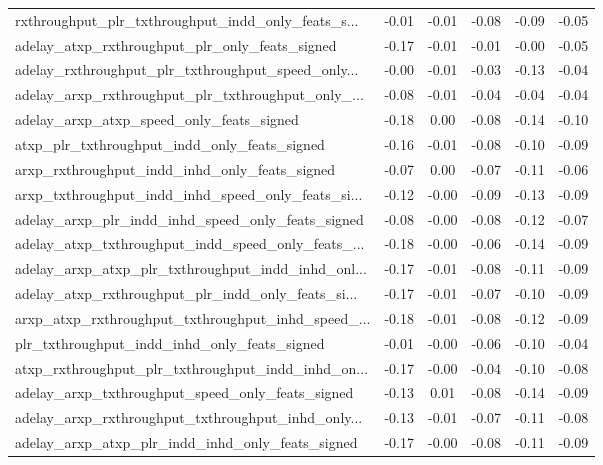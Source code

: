 \begin{tabular}{|l|*{4}{c}|r|}
rxthroughput\_plr\_txthroughput\_indd\_only\_feats\_s... & -0.01 & -0.01 &   -0.08 &      -0.09 & -0.05 \\
adelay\_atxp\_rxthroughput\_plr\_only\_feats\_signed     & -0.17 & -0.01 &   -0.01 &      -0.00 & -0.05 \\
adelay\_rxthroughput\_plr\_txthroughput\_speed\_only... & -0.00 & -0.01 &   -0.03 &      -0.13 & -0.04 \\
adelay\_arxp\_rxthroughput\_plr\_txthroughput\_only\_... & -0.08 & -0.01 &   -0.04 &      -0.04 & -0.04 \\
adelay\_arxp\_atxp\_speed\_only\_feats\_signed           & -0.18 &  0.00 &   -0.08 &      -0.14 & -0.10 \\
atxp\_plr\_txthroughput\_indd\_only\_feats\_signed       & -0.16 & -0.01 &   -0.08 &      -0.10 & -0.09 \\
arxp\_rxthroughput\_indd\_inhd\_only\_feats\_signed      & -0.07 &  0.00 &   -0.07 &      -0.11 & -0.06 \\
arxp\_txthroughput\_indd\_inhd\_speed\_only\_feats\_si... & -0.12 & -0.00 &   -0.09 &      -0.13 & -0.09 \\
adelay\_arxp\_plr\_indd\_inhd\_speed\_only\_feats\_signed  & -0.08 & -0.00 &   -0.08 &      -0.12 & -0.07 \\
adelay\_atxp\_txthroughput\_indd\_speed\_only\_feats\_... & -0.18 & -0.00 &   -0.06 &      -0.14 & -0.09 \\
adelay\_arxp\_atxp\_plr\_txthroughput\_indd\_inhd\_onl... & -0.17 & -0.01 &   -0.08 &      -0.11 & -0.09 \\
adelay\_atxp\_rxthroughput\_plr\_indd\_only\_feats\_si... & -0.17 & -0.01 &   -0.07 &      -0.10 & -0.09 \\
arxp\_atxp\_rxthroughput\_txthroughput\_inhd\_speed\_... & -0.18 & -0.01 &   -0.08 &      -0.12 & -0.09 \\
plr\_txthroughput\_indd\_inhd\_only\_feats\_signed       & -0.01 & -0.00 &   -0.06 &      -0.10 & -0.04 \\
atxp\_rxthroughput\_plr\_txthroughput\_indd\_inhd\_on... & -0.17 & -0.00 &   -0.04 &      -0.10 & -0.08 \\
adelay\_arxp\_txthroughput\_speed\_only\_feats\_signed   & -0.13 &  0.01 &   -0.08 &      -0.14 & -0.09 \\
adelay\_arxp\_rxthroughput\_txthroughput\_inhd\_only... & -0.13 & -0.01 &   -0.07 &      -0.11 & -0.08 \\
adelay\_arxp\_atxp\_plr\_indd\_inhd\_only\_feats\_signed   & -0.17 & -0.00 &   -0.08 &      -0.11 & -0.09 \\

\end{tabular}
